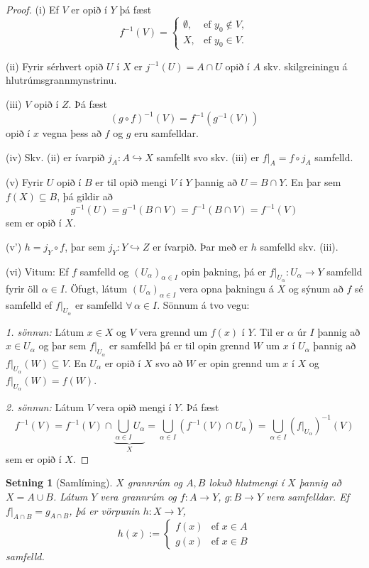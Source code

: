 \documentclass[a4paper,icelandic]{book}
\theoremstyle{definition}
\theoremstyle{plain}
\newtheorem{setn}{Setning}[section]
\theoremstyle{remark}
\begin{document}
\begin{proof}
  (i) Ef $V$ er opið í $Y$ þá fæst 
  \[
  f^{-1}(V) =
  \begin{cases}
    \emptyset, & \text{ef $y_0\notin V$},\\
    X,         & \text{ef $y_0\in V$}.
  \end{cases}
  \]

  (ii) Fyrir sérhvert opið $U$ í $X$ er $j^{-1}(U) = A\cap U$ opið í $A$ skv.
  skilgreiningu á hlutrúmsgrannmynstrinu.

  (iii) $V$ opið í $Z$. Þá fæst 
  \[
  (g\circ f)^{-1}(V)
  = f^{-1}(g^{-1}(V))
  \]
  opið í $x$ vegna þess að $f$ og $g$ eru samfelldar.

  (iv) Skv. (ii) er ívarpið $j_A:A\hookrightarrow X$ samfellt svo skv. (iii) er
  $f|_A = f\circ j_A$ samfelld.

  (v) Fyrir $U$ opið í $B$ er til opið mengi $V$ í $Y$ þannig að $U = B\cap Y$.
  En þar sem $f(X)\subseteq B$, þá gildir að 
  \[
  g^{-1}(U)
  = g^{-1}(B\cap V)
  = f^{-1}(B\cap V)
  = f^{-1}(V)
  \]
  sem er opið í $X$.

  (v') $h=j_Y \circ f$, þar sem $j_Y : Y\hookrightarrow Z$ er ívarpið. Þar með
  er $h$ samfelld skv. (iii).

  (vi) Vitum: Ef $f$ samfelld og $(U_\alpha)_{\alpha\in I}$ opin þakning, þá er
  $f|_{U_{\alpha}}:U_\alpha\to Y$ samfelld fyrir öll $\alpha\in I$. Öfugt, látum
  $(U_\alpha)_{\alpha\in I}$ vera opna þakningu á $X$ og sýnum að $f$ sé
  samfelld ef $f|_{U_\alpha}$ er samfelld $\forall\,\alpha\in I$. Sönnum á tvo
  vegu:

  \emph{1. sönnun:} Látum $x\in X$ og $V$ vera grennd um $f(x)$ í $Y$. Til er
  $\alpha$ úr $I$ þannig að $x\in U_\alpha$ og þar sem $f|_{U_\alpha}$ er
  samfelld þá er til opin grennd $W$ um $x$ í $U_\alpha$ þannig að
  $f|_{U_\alpha}(W)\subseteq V$. En $U_\alpha$ er opið í $X$ svo að $W$ er opin
  grennd um $x$ í $X$ og $f|_{U_\alpha}(W)=f(W)$.

  \emph{2. sönnun:} Látum $V$ vera opið mengi í $Y$. Þá fæst
  \[
  f^{-1}(V)
  = f^{-1}(V)\cap \underbrace{\bigcup_{\alpha\in I} U_\alpha}_{X}
  = \bigcup_{\alpha\in I} (f^{-1}(V)\cap U_\alpha)
  = \bigcup_{\alpha\in I} \left( f|_{U_\alpha} \right)^{-1}(V)
  \]
  sem er opið í $X$.
\end{proof}
\begin{setn}
  [Samlíming]
  $X$ grannrúm og $A,B$ lokuð hlutmengi í $X$ þannig að $X= A\cup B$. Látum
  $Y$ vera grannrúm og $f:A\to Y$, $g:B\to Y$ vera samfelldar. Ef $f|_{A\cap B}
  = g_{A\cap B}$, þá er vörpunin $h:X\to Y$, 
  \[
  h(x) :=
  \begin{cases}
    f(x) & \text{ef $x\in A$}\\
    g(x) & \text{ef $x\in B$}
  \end{cases}
  \]
  samfelld.
\end{setn}
\end{document}

